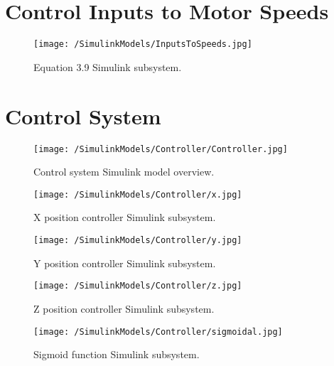 \FloatBarrier
\clearpage
\section{Control Inputs to Motor Speeds}\label{section:Simu_Motor}

\begin{figure}[htb]
\begin{center}
	\texttt{[image: /SimulinkModels/InputsToSpeeds.jpg]}%
	\end{center}
	\caption{Equation 3.9 Simulink subsystem.}%
\end{figure}
\FloatBarrier
\clearpage

\section{Control System}\label{section:Simu_Control}

\begin{figure}[htb]
\begin{center}
	\texttt{[image: /SimulinkModels/Controller/Controller.jpg]}%
	\end{center}
	\caption{Control system Simulink model overview.}%
\end{figure}

\begin{figure}[htb]
\begin{center}
	\texttt{[image: /SimulinkModels/Controller/x.jpg]}%
	\end{center}
	\caption{X position controller Simulink subsystem.}%
\end{figure}

\begin{figure}[htb]
\begin{center}
	\texttt{[image: /SimulinkModels/Controller/y.jpg]}%
	\end{center}
	\caption{Y position controller Simulink subsystem.}%
\end{figure}

\begin{figure}[htb]
\begin{center}
	\texttt{[image: /SimulinkModels/Controller/z.jpg]}%
	\end{center}
	\caption{Z position controller Simulink subsystem.}%
\end{figure}

\begin{figure}[htb]
\begin{center}
	\texttt{[image: /SimulinkModels/Controller/sigmoidal.jpg]}%
	\end{center}
	\caption{Sigmoid function Simulink subsystem.}%
\end{figure}


